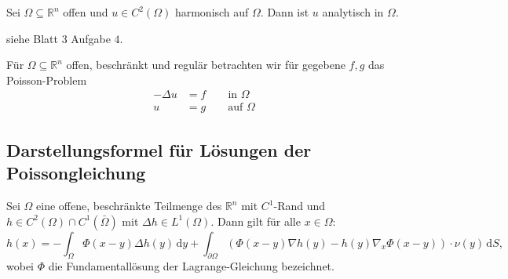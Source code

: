 \begin{satz}
 	   Sei $\Omega \subseteq \mathbb{R}^n$ offen und $u \in C^2(\Omega)$ harmonisch auf $\Omega$. Dann ist $u$ analytisch in $\Omega$.
\end{satz}

\begin{beweis}
	siehe Blatt $3$ Aufgabe $4$.
\end{beweis}

Für $\Omega \subseteq \mathbb{R}^n$ offen, beschränkt und regulär betrachten wir für gegebene $f,g$ das Poisson-Problem
\begin{align}
	- \Delta u &= f \qquad \text{in }\Omega \\
	u &= g \qquad \text{auf }\Omega
\end{align}

\subsection{Darstellungsformel für Lösungen der Poissongleichung} 
\label{sub:darstellungsformel_fur_losungen_der_poissongleichung}

\begin{satz}
	Sei $\Omega $ eine offene, beschränkte Teilmenge des $\mathbb{R}^n$ mit $C^1$-Rand und $h \in C^2(\Omega) \cap C^1(\bar{\Omega})$ mit $ \Delta h \in L^1(\Omega)$.
	Dann gilt für alle $x \in \Omega$:
	\begin{equation}
		h(x) = - \int_{\Omega}^{} \Phi(x-y) \Delta h(y) \,\mathrm{d}y 
		+ \int_{\partial \Omega}^{} \left( \Phi(x-y)  \nabla h(y) - h(y)  \nabla_x \Phi(x-y) \right) \cdot \nu(y) \,\mathrm{d}S,
	\end{equation}
	wobei $\Phi$ die Fundamentallösung der Lagrange-Gleichung bezeichnet.
\end{satz}

